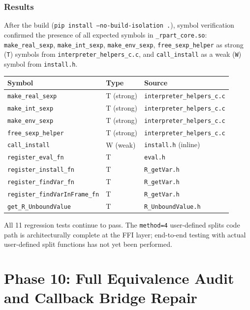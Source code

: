 \documentclass[12pt]{article}
\begin{document}
\subsubsection{Results}

After the build (\texttt{pip install --no-build-isolation .}), symbol verification confirmed the presence of all expected symbols in \texttt{\_rpart\_core.so}: \texttt{make\_real\_sexp}, \texttt{make\_int\_sexp}, \texttt{make\_env\_sexp}, \texttt{free\_sexp\_helper} as strong (\texttt{T}) symbols from \texttt{interpreter\_helpers\_c.c}, and \texttt{call\_install} as a weak (\texttt{W}) symbol from \texttt{install.h}.

\medskip
\begin{center}
\begin{tabular}{lll}
\toprule
Symbol & Type & Source \\
\midrule
\texttt{make\_real\_sexp} & T (strong) & \texttt{interpreter\_helpers\_c.c} \\
\texttt{make\_int\_sexp} & T (strong) & \texttt{interpreter\_helpers\_c.c} \\
\texttt{make\_env\_sexp} & T (strong) & \texttt{interpreter\_helpers\_c.c} \\
\texttt{free\_sexp\_helper} & T (strong) & \texttt{interpreter\_helpers\_c.c} \\
\texttt{call\_install} & W (weak) & \texttt{install.h} (inline) \\
\texttt{register\_eval\_fn} & T & \texttt{eval.h} \\
\texttt{register\_install\_fn} & T & \texttt{R\_getVar.h} \\
\texttt{register\_findVar\_fn} & T & \texttt{R\_getVar.h} \\
\texttt{register\_findVarInFrame\_fn} & T & \texttt{R\_getVar.h} \\
\texttt{get\_R\_UnboundValue} & T & \texttt{R\_UnboundValue.h} \\
\bottomrule
\end{tabular}
\end{center}
\medskip

All 11 regression tests continue to pass. The \texttt{method=4} user-defined splits code path is architecturally complete at the FFI layer; end-to-end testing with actual user-defined split functions has not yet been performed.

\section{Phase 10: Full Equivalence Audit and Callback Bridge Repair}
\label{sec:phase10}
\end{document}
